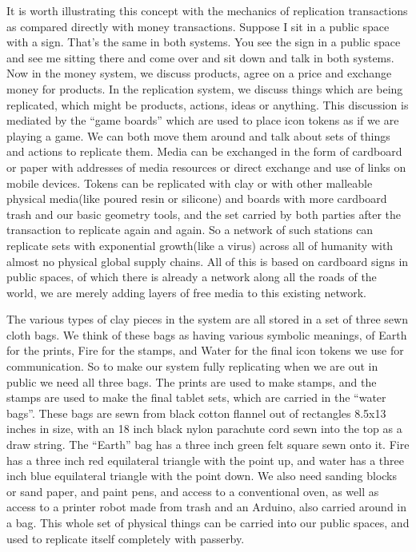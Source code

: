 It is worth illustrating this concept with the mechanics of replication
transactions as compared directly with money transactions. Suppose I sit
in a public space with a sign. That's the same in both systems. You see
the sign in a public space and see me sitting there and come over and
sit down and talk in both systems. Now in the money system, we discuss
products, agree on a price and exchange money for products. In the
replication system, we discuss things which are being replicated, which
might be products, actions, ideas or anything. This discussion is
mediated by the ``game boards'' which are used to place icon tokens as
if we are playing a game. We can both move them around and talk about
sets of things and actions to replicate them. Media can be exchanged in
the form of cardboard or paper with addresses of media resources or
direct exchange and use of links on mobile devices. Tokens can be
replicated with clay or with other malleable physical media(like poured
resin or silicone) and boards with more cardboard trash and our basic
geometry tools, and the set carried by both parties after the
transaction to replicate again and again. So a network of such stations
can replicate sets with exponential growth(like a virus) across all of
humanity with almost no physical global supply chains. All of this is
based on cardboard signs in public spaces, of which there is already a
network along all the roads of the world, we are merely adding layers of
free media to this existing network.

The various types of clay pieces in the system are all stored in a set
of three sewn cloth bags. We think of these bags as having various
symbolic meanings, of Earth for the prints, Fire for the stamps, and
Water for the final icon tokens we use for communication. So to make our
system fully replicating when we are out in public we need all three
bags. The prints are used to make stamps, and the stamps are used to
make the final tablet sets, which are carried in the ``water bags''.
These bags are sewn from black cotton flannel out of rectangles 8.5x13
inches in size, with an 18 inch black nylon parachute cord sewn into the
top as a draw string. The ``Earth'' bag has a three inch green felt
square sewn onto it. Fire has a three inch red equilateral triangle with
the point up, and water has a three inch blue equilateral triangle with
the point down. We also need sanding blocks or sand paper, and paint
pens, and access to a conventional oven, as well as access to a printer
robot made from trash and an Arduino, also carried around in a bag. This
whole set of physical things can be carried into our public spaces, and
used to replicate itself completely with passerby.

